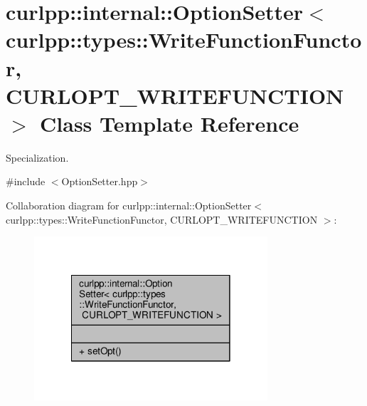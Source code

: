 \hypertarget{classcurlpp_1_1internal_1_1OptionSetter_3_01curlpp_1_1types_1_1WriteFunctionFunctor_00_01CURLOPT__WRITEFUNCTION_01_4}{\section{curlpp\-:\-:internal\-:\-:Option\-Setter$<$ curlpp\-:\-:types\-:\-:Write\-Function\-Functor, C\-U\-R\-L\-O\-P\-T\-\_\-\-W\-R\-I\-T\-E\-F\-U\-N\-C\-T\-I\-O\-N $>$ Class Template Reference}
\label{classcurlpp_1_1internal_1_1OptionSetter_3_01curlpp_1_1types_1_1WriteFunctionFunctor_00_01CURLOPT__WRITEFUNCTION_01_4}
}


Specialization.  




{\ttfamily \#include $<$Option\-Setter.\-hpp$>$}



Collaboration diagram for curlpp\-:\-:internal\-:\-:Option\-Setter$<$ curlpp\-:\-:types\-:\-:Write\-Function\-Functor, C\-U\-R\-L\-O\-P\-T\-\_\-\-W\-R\-I\-T\-E\-F\-U\-N\-C\-T\-I\-O\-N $>$\-:
\nopagebreak
\begin{figure}[H]
\begin{center}
\leavevmode
\includegraphics[width=246pt]{classcurlpp_1_1internal_1_1OptionSetter_3_01curlpp_1_1types_1_1WriteFunctionFunctor_00_01CURLOPT7bc9d754129ea738b6fa38db0175fa4b}
\end{center}
\end{figure}
